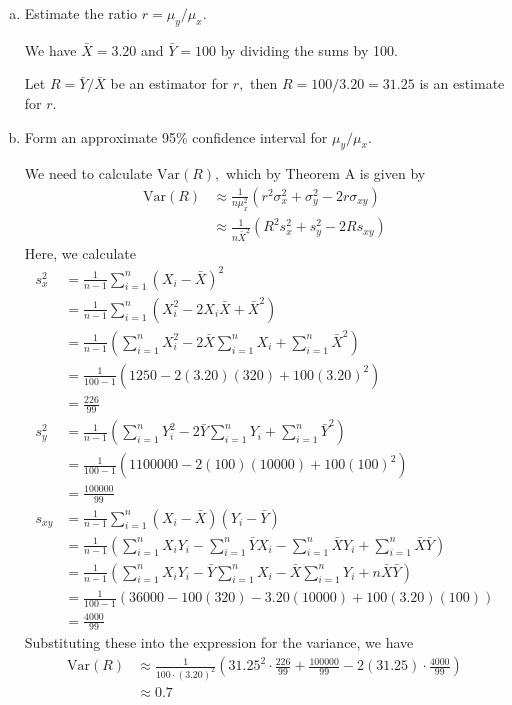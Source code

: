 \documentclass{article}
\newcommand{\var}{\mathrm{Var}}
\begin{document}
\begin{itemize}
		\begin{enumerate}[a.]
			\item Estimate the ratio $r=\mu_y/\mu_x.$
				\begin{soln}
					We have $\bar{X}=3.20$ and $\bar{Y}=100$ by dividing the sums by 100. 
					
					Let $R=\bar{Y}/\bar{X}$ be an estimator for $r,$ then $R=100/3.20=\boxed{31.25}$ is an estimate for $r.$

				\end{soln}

			\item Form an approximate 95\% confidence interval for $\mu_y/\mu_x.$ 
				\begin{soln}
					We need to calculate $\var(R),$ which by Theorem A is given by
					\begin{align*}
						\var(R) &\approx \frac{1}{n\mu_x^2}(r^2\sigma_x^2 + \sigma_y^2-2r\sigma_{xy}) \\
						&\approx \frac{1}{n\bar{X}^2}(R^2s_x^2 + s_y^2-2Rs_{xy})
					\end{align*}
					Here, we calculate
					\begin{align*}
						s_x^2 &= \frac{1}{n-1}\sum_{i=1}^{n} (X_i-\bar{X})^2 \\
						&= \frac{1}{n-1} \sum_{i=1}^{n} (X_i^2-2X_i\bar{X}+\bar{X}^2) \\
						&= \frac{1}{n-1}\left( \sum_{i=1}^{n} X_i^2 - 2\bar{X}\sum_{i=1}^{n} X_i + \sum_{i=1}^{n} \bar{X}^2 \right) \\
						&= \frac{1}{100-1}\left( 1250 - 2(3.20)(320) + 100(3.20)^2 \right) \\
						&= \frac{226}{99} \\
						s_y^2 &= \frac{1}{n-1} \left( \sum_{i=1}^{n} Y_i^2 - 2\bar{Y}\sum_{i=1}^{n} Y_i + \sum_{i=1}^{n} \bar{Y}^2 \right) \\
						&= \frac{1}{100-1} \left( 1100000-2(100)(10000)+100(100)^2 \right) \\
						&= \frac{100000}{99} \\
						s_{xy} &= \frac{1}{n-1} \sum_{i=1}^{n}(X_i-\bar{X})(Y_i-\bar{Y}) \\
						&= \frac{1}{n-1} \left( \sum_{i=1}^{n}X_iY_i-\sum_{i=1}^{n}\bar{Y}X_i - \sum_{i=1}^{n} \bar{X}Y_i + \sum_{i=1}^{n} \bar{X}\bar{Y}\right) \\
						&= \frac{1}{n-1} \left( \sum_{i=1}^{n}X_iY_i - \bar{Y}\sum_{i=1}^{n}X_i - \bar{X}\sum_{i=1}^{n} Y_i  + n\bar{X}\bar{Y}\right) \\
						&= \frac{1}{100-1}\left( 36000-100(320)-3.20(10000)+100(	3.20)(100) \right) \\
						&= \frac{4000}{99}
					\end{align*}
					Substituting these into the expression for the variance, we have
					\begin{align*}
						\var(R) &\approx \frac{1}{100\cdot(3.20)^2}\left(31.25^2\cdot \frac{226}{99} + \frac{100000}{99} - 2(31.25)\cdot\frac{4000}{99}\right) \\
						&\approx0.7
					\end{align*}


\end{soln}
\end{enumerate}
\end{itemize}
\end{document}
